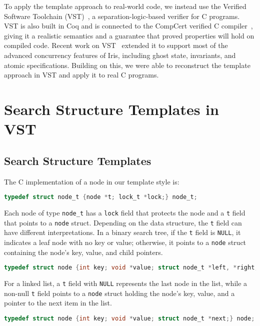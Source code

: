 \documentclass[a4paper,UKenglish,cleveref, autoref, thm-restate]{lipics-v2021}
\begin{document}
To apply the template approach to real-world code, we instead use the Verified Software Toolchain (VST)~\cite{plcc}, a separation-logic-based verifier for C programs. VST is also built in Coq and is connected to the CompCert verified C compiler~\cite{compcert}, giving it a realistic semantics and a guarantee that proved properties will hold on compiled code. Recent work on VST~\cite{vst-iris} extended it to support most of the advanced concurrency features of Iris, including ghost state, invariants, and atomic specifications. Building on this, we were able to reconstruct the template approach in VST and apply it to real C programs. %

\section{Search Structure Templates in VST}

\subsection{Search Structure Templates}
\label{templates}
The C implementation of a node in our template style is:
\begin{lstlisting}[language = C, backgroundcolor=\color{white}, basicstyle=\ttfamily\footnotesize]
typedef struct node_t {node *t; lock_t *lock;} node_t;
\end{lstlisting}

Each node of type \lstinline{node_t} has a \lstinline{lock} field that protects the node and a \lstinline{t} field that points to a \lstinline{node} struct. Depending on the data structure, the \lstinline{t} field can have different interpretations. In a binary search tree, if the \lstinline{t} field is \lstinline{NULL}, it indicates a leaf node with no key or value; otherwise, it points to a \lstinline{node} struct containing the node's key, value, and child pointers. 
\begin{lstlisting}[language = C, backgroundcolor=\color{white}, basicstyle=\ttfamily\footnotesize]
typedef struct node {int key; void *value; struct node_t *left, *right;} node;
\end{lstlisting}

For a linked list, a \lstinline{t} field with \lstinline{NULL} represents the last node in the list, while a non-null \lstinline{t} field points to a \lstinline{node} struct holding the node's key, value, and a pointer to the next item in the list. 

\begin{lstlisting}[language = C, backgroundcolor=\color{white}, basicstyle=\ttfamily\footnotesize]
typedef struct node {int key; void *value; struct node_t *next;} node;
\end{lstlisting}
\end{document}
